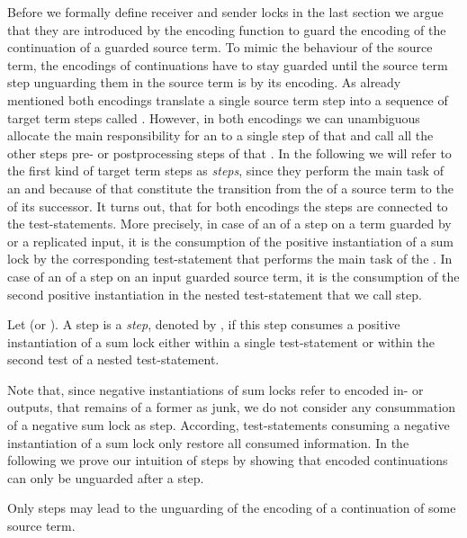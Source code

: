 \documentclass[]{llncs}
\begin{document}
Before we formally define receiver and sender locks in the last section we argue that they are introduced by the encoding function to guard the encoding of the continuation of a guarded source term. To mimic the behaviour of the source term, the encodings of continuations have to stay guarded until the source term step unguarding them in the source term is \simulated by its encoding. As already mentioned both encodings translate a single source term step into a sequence of target term steps called \simulation. However, in both encodings we can unambiguous allocate the main responsibility for an \simulation to a single step of that \simulation and call all the other steps pre- or postprocessing steps of that \simulation. In the following we will refer to the first kind of target term steps as \emph{\nonAdmin steps}, since they perform the main task of an \simulation and because of that constitute the transition from the \simulation of a source term to the \simulation of its successor. It turns out, that for both encodings the \nonAdmin steps are connected to the test-statements. More precisely, in case of an \simulation of a step on a term guarded by  or a replicated input, it is the consumption of the positive instantiation of a sum lock by the corresponding test-statement that performs the main task of the \simulation. In case of an \simulation of a step on an input guarded source term, it is the consumption of the second positive instantiation in the nested test-statement that we call \nonAdmin step.

\begin{definition} \label{def:nonAdminStep}
	Let  (or ). A step  is a \emph{\nonAdmin step}, denoted by , if this step consumes a positive instantiation of a sum lock either within a single test-statement or within the second test of a nested test-statement.
\end{definition}

Note that, since negative instantiations of sum locks refer to encoded in- or outputs, that remains of a former \simulation as junk, we do not consider any consummation of a negative sum lock as \nonAdmin step. According, test-statements consuming a negative instantiation of a sum lock only restore all consumed information. In the following we prove our intuition of \nonAdmin steps by showing that encoded continuations can only be unguarded after a \nonAdmin step.

\begin{lemma} \label{lem:nonAdminStepContinuation}
	Only \nonAdmin steps may lead to the unguarding of the encoding of a continuation of some source term.
\end{lemma}
\end{document}
